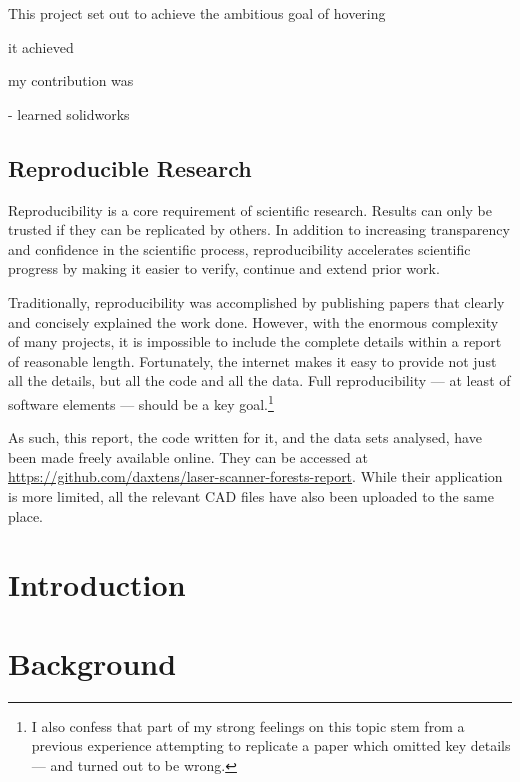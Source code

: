 \documentclass[12pt,oneside,a4paper]{book}
\begin{document}
This project set out to achieve the ambitious goal of hovering

it achieved

my contribution was

- learned solidworks


\section{Reproducible Research}
\label{sec:repr-rese}

Reproducibility is a core requirement of scientific research. Results
can only be trusted if they can be replicated by others. In addition
to increasing transparency and confidence in the scientific process,
reproducibility accelerates scientific progress by making it easier to
verify, continue and extend prior work.

Traditionally, reproducibility was accomplished by publishing papers
that clearly and concisely explained the work done. However, with the
enormous complexity of many projects, it is impossible to include the
complete details within a report of reasonable length. Fortunately,
the internet makes it easy to provide not just all the details, but
all the code and all the data. Full reproducibility --- at least of
software elements --- should be a key goal.\footnote{I also
  confess that part of my strong feelings on this topic stem from a
  previous experience attempting to replicate a paper which omitted
  key details --- and turned out to be wrong. }

As such, this report, the code written for it, and the data sets
analysed, have been made freely available online. They can be accessed
at \url{https://github.com/daxtens/laser-scanner-forests-report}.
While their application is more limited, all the relevant CAD files
have also been uploaded to the same place.





\chapter{Introduction}
\label{cha:intro}

\chapter{Background}
\label{cha:background}
\end{document}
